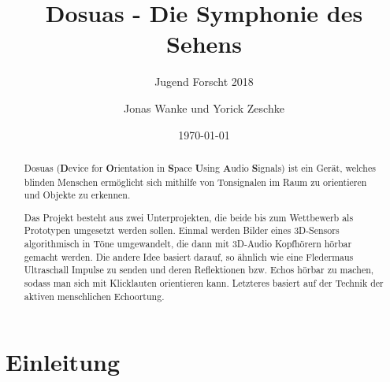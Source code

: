 \documentclass[a4paper,12pt,ngerman]{scrartcl}
\title{Dosuas - Die Symphonie des Sehens}
\subtitle{Jugend Forscht 2018}
\author{Jonas Wanke und Yorick Zeschke}
\date{\today}
\begin{document}
\maketitle


\begin{abstract}
Dosuas (\textbf{D}evice for \textbf{O}rientation in \textbf{S}pace \textbf{U}sing 
\textbf{A}udio \textbf{S}ignals) ist ein Gerät, welches blinden Menschen ermöglicht
sich mithilfe von Tonsignalen im Raum zu orientieren und Objekte zu erkennen.\par
Das Projekt besteht aus zwei Unterprojekten, die beide bis zum 
Wettbewerb als Prototypen umgesetzt werden sollen. Einmal werden Bilder eines 3D-Sensors 
algorithmisch in Töne umgewandelt, die dann mit 3D-Audio Kopfhörern hörbar gemacht
werden. Die andere Idee basiert darauf, so ähnlich wie eine Fledermaus Ultraschall 
Impulse zu senden und deren Reflektionen bzw. Echos hörbar zu machen, sodass man
sich mit Klicklauten orientieren kann. Letzteres basiert auf der Technik der aktiven
menschlichen Echoortung.
\end{abstract}


\tableofcontents

\newpage


\section{Einleitung}
\end{document}
